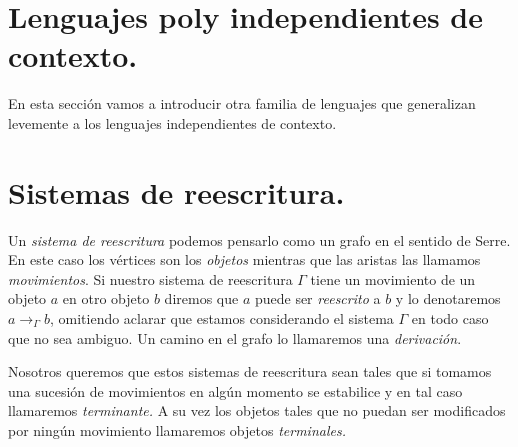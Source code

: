 \documentclass[tesis.tex]{subfiles}
\newcommand{\APD}{automáta de pila determinístico }
\begin{document}
\begin{ej}
	\begin{comment}[Esto es con la otra definición de automáta de pila.]
			Por el principio del palomar podemos ver que este lenguaje no es aceptado por \APD por pila vacía y estado final a la vez. Si así lo fuera supongamos que existe un automáta que lo acepta $M = (Q, \Sigma, Z, Z_0, \delta, q_0 , F)$. Debido a que tiene finitos estados podemos elegirnos $m$ suficientemente grande tal que existan palabras $a^mb^j, a^mb^i$ con $1 \le i < j < m$ y elegidas de manera que terminen en el mismo estado final $p$. Notemos que $(q_0,a^mb^ib^{m-j+1},Z_0) \vdash^* (q,\lambda, Z)$ donde $q$ es un estado final dado que $m-j+1+i \le m$. Por otro lado debe ser que $(q_0, a^mb^jb^{m-j+1}) \vdash^* (q,\lambda, Z) $ pero notemos que $a^mb^{m-1} \notin L$. Por lo tanto llegamos a una contradicción y de esta manera vemos que $L$ no es aceptado por un \APD especial tal como queríamos ver.
	\end{comment}

	
\end{ej}





\section{Lenguajes poly independientes de contexto.}

En esta sección vamos a introducir otra familia de lenguajes que generalizan levemente a los lenguajes independientes de contexto.





\section{Sistemas de reescritura.}

Un \emph{sistema de reescritura} podemos pensarlo como un grafo en el sentido de Serre. En este caso los vértices son los \emph{objetos} mientras que las aristas las llamamos \emph{movimientos}.  Si nuestro sistema de reescritura $\Gamma$ tiene un movimiento de un objeto $a$ en otro objeto $b$ diremos que $a$ puede ser \emph{reescrito} a $b$ y lo denotaremos $a \to_{\Gamma} b$, omitiendo aclarar que estamos considerando el sistema $\Gamma$ en todo caso que no sea ambiguo. Un camino en el grafo lo llamaremos una \emph{derivación}.  

Nosotros queremos que estos sistemas de reescritura sean tales que si tomamos una sucesión de movimientos en algún momento se estabilice y en tal caso llamaremos \emph{terminante.} A su vez los objetos tales que no puedan ser modificados por ningún movimiento llamaremos objetos \emph{terminales.} 
\end{document}
